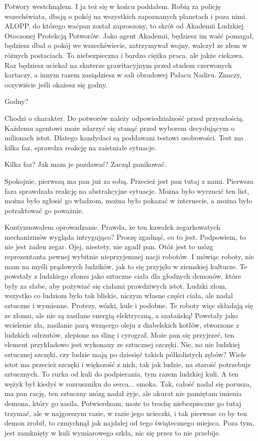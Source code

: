 \ds{} Potwory \dm{} westchnąłem. I ja też się w końcu poddałem. \dm{} Robią za policję wszechświata, dbają o pokój na wszystkich zapoznanych planetach i poza nimi. 
ALOPP, do którego waćpan został zaproszony, to skrót od Akademii Ludzkiej Otoczonej Protekcją Potworów. 
Jako agent Akademii, będziesz im waść pomagał, będziesz dbał o pokój we wszechświecie, zatrzymywał wojny, walczył ze złem w różnych postaciach. 
To niebezpieczna i bardzo ciężka praca, ale jakże ciekawa.
Raz będziesz uciekał na skuterze grawitacyjnym przed stadem czerwonych kartaczy, a innym razem zasiądziesz w sali obradowej Pałacu Nadiru. 
Znaczy, oczywiście jeśli okażesz się godny. \de{}

\ds{} Godny? \de{}

\ds{} Chodzi o charakter. Do potworów należy odpowiedzialność przed przyszłością. 
Każdemu agentowi może zdarzyć się stanąć przed wyborem decydującym o milionach istot. 
Dlatego kandydaci są poddawani testowi osobowości. Test ma kilka faz, sprawdza reakcję na zaistniałe sytuacje. \de{}

\ds{} Kilka faz? Jak mam je pozdawać? \dm{} Zaczął panikować. \de{}

\ds{} Spokojnie, pierwszą ma pan już za sobą. Przecież jest pan tutaj z nami. 
Pierwsza faza sprawdzała reakcję na abstrakcyjne sytuacje.
Można było wyrzucić ten list, można było zgłosić go władzom, można było pokazać w internecie, a można było potraktować go poważnie. \de{}

Kontynuowałem oprowadzanie.
Prawda, że ten kawałek zegarkowatych mechanizmów wygląda intrygująco? 
Proszę zgadnąć, co to jest. Podpowiem, to nie jest żaden zegar.
Ojej, niestety, nie zgadł pan.
Otóż jest to mózg reprezentanta pewnej wybitnie nieprzyjemnej nacji robotów.
I mówiąc roboty, nie mam na myśli prądowych ludzików, jak to się przyjęło w ziemskiej kulturze.
Te powstały z ludzkiego złomu jako sztuczne ciała dla głodnych demonów, które były za słabe, aby pożywiać się ciałami prawdziwych istot.
Ludzki złom, wszystko co ludziom było tak bliskie, niczym własne części ciała, ale nadal sztuczne i wymienne. Protezy, wózki, kule i podobne.
Te roboty więc składają się ze złomu, ale nie są zasilane energią elektryczną, a szatańską!
Powstały jako wcielenie zła, zasilanie parą wrzącego oleju z diabelskich kotłów, stworzone z ludzkich odrzutów, zlepione na ślinę i cyrograf.
Może pan się przyjrzeć, ten element przykładowo jest wykonany ze sztucznej szczęki.
Nie, no nie ludzkiej sztucznej szczęki, czy ludzie mają po dziesięć takich półkolistych zębów?
Wiele istot ma przecież szczęki i większość z nich, tak jak ludzie, na starość potrzebuje sztucznych.
To rurka od kuli do podpierania, tym razem ludzkiej kuli. A ten wężyk był kiedyś w rozruszniku do serca... smoka.
Tak, całość nadal się porusza, ma pan rację, ten sztuczny mózg nadal żyje, ale akurat nie pamiętam imienia demona, który go zasila.
Potwierdzam, może to trochę niebezpieczne go tutaj trzymać, ale w najgorszym razie, w razie jego ucieczki, i tak pierwsze co by ten demon zrobił, to czmychnął jak najdalej od tego świątecznego miejsca. Poza tym, jest zamknięty w kuli wymiarowego szkła, nic się przez to nie przebije.

